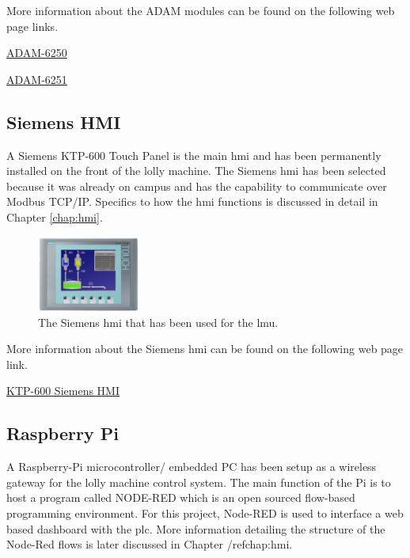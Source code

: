         More information about the ADAM modules can be found on the following web page links.
        
        \href{https://www.advantech.com/en-au/products/7447e150-338d-402d-b5a1-c9ce6d98816e/adam-6250/mod_da940b26-501f-413e-bfbc-732fd7496782}{ADAM-6250} \cite{6250Data} 
    
        \href{https://www.advantech.com/en-au/products/7447e150-338d-402d-b5a1-c9ce6d98816e/adam-6251/mod_98139b28-a181-4c45-83c9-01db52c3db7f}{ADAM-6251} \cite{6251Data} 
        

    \subsection{Siemens HMI}
        A Siemens KTP-600 Touch Panel is the main \acrshort{hmi} and has been permanently installed on the front of the lolly machine. The Siemens \acrshort{hmi} has been selected because it was already on campus and has the capability to communicate over Modbus TCP/IP. Specifics to how the \acrshort{hmi} functions is discussed in detail in Chapter \ref{chap:hmi}.
    
        \begin{figure}[H]
            \centering
            \includegraphics[width = 0.3\textwidth]{2_images/ktp600}
            \caption{The Siemens \acrshort{hmi} that has been used for the \acrshort{lmu}\cite{ktp600Data}.}
            \label{fig:hmi}
        \end{figure}
    
        More information about the Siemens \acrshort{hmi} can be found on the following web page link.
    
        \href{https://support.industry.siemens.com/cs/document/31032678/simatic-hmi-hmi-devices-basic-panels?dti=0&lc=en-WW}{KTP-600 Siemens HMI} \cite{ktp600Data} 
        
    
    \subsection{Raspberry Pi}
    A Raspberry-Pi microcontroller/ embedded PC has been setup as a wireless gateway for the lolly machine control system. The main function of the Pi is to host a program called NODE-RED which is an open sourced flow-based programming environment. For this project, Node-RED is used to interface a web based dashboard with the \acrshort{plc}. More information detailing the structure of the Node-Red flows is later discussed in Chapter /ref{chap:hmi}.
    
